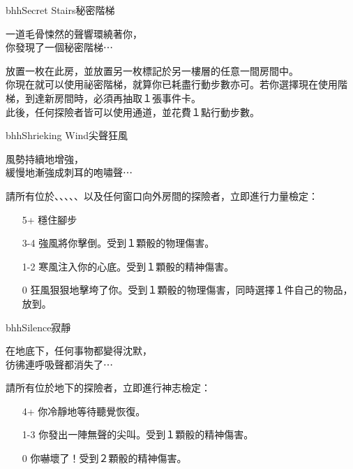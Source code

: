 \linebreak[0]%
\begin{EventCard}{bhh}{Secret Stairs}{秘密階梯}
  \begin{CardStory}
    一道毛骨悚然的聲響環繞著你，\\
    你發現了一個秘密階梯⋯
  \end{CardStory}
  放置一枚在此房，並放置另一枚標記於另一樓層的任意一間房間中。\\[0.5em]
  你現在就可以使用祕密階梯，就算你已耗盡行動步數亦可。若你選擇現在使用階梯，到達新房間時，必須再抽取１張事件卡。\\[0.5em]
  此後，任何探險者皆可以使用通道，並花費１點行動步數。\\[0.5em]
\end{EventCard}%
\linebreak[0]%
\begin{EventCard}{bhh}{Shrieking Wind}{尖聲狂風}
  \begin{CardStory}
    風勢持續地增強，\\
    緩慢地漸強成刺耳的咆嘯聲⋯
  \end{CardStory}
  請所有位於、、、、、以及任何窗口向外房間的探險者，立即進行力量檢定：
  \begin{itemize}
    \item[5+] 穩住腳步
    \item[3-4] 強風將你擊倒。受到１顆骰的物理傷害。
    \item[1-2] 寒風注入你的心底。受到１顆骰的精神傷害。
    \item[0] 狂風狠狠地擊垮了你。受到１顆骰的物理傷害，同時選擇１件自己的物品，放到。
  \end{itemize}
\end{EventCard}%
\linebreak[0]%
\begin{EventCard}{bhh}{Silence}{寂靜}
  \begin{CardStory}
    在地底下，任何事物都變得沈默，\\
    彷彿連呼吸聲都消失了⋯
  \end{CardStory}
  請所有位於地下的探險者，立即進行神志檢定：
  \begin{itemize}
    \item[4+] 你冷靜地等待聽覺恢復。
    \item[1-3] 你發出一陣無聲的尖叫。受到１顆骰的精神傷害。
    \item[0] 你嚇壞了！受到２顆骰的精神傷害。
  \end{itemize}
\end{EventCard}%
